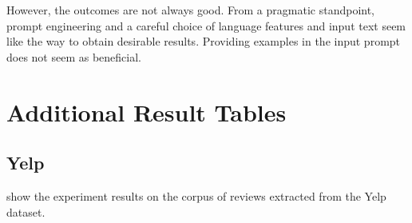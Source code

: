 \documentclass[11pt]{article}
\begin{document}
However, the outcomes are not always good.
From a pragmatic standpoint, prompt engineering and a careful choice of language
features and input text seem like the way to obtain desirable results.
Providing examples in the input prompt does not seem as beneficial.



\appendix

\section{Additional Result Tables}\label{sec:yelp-tables}
\subsection{Yelp}
 show the
experiment results on the corpus of reviews extracted from the Yelp dataset.
\end{document}
